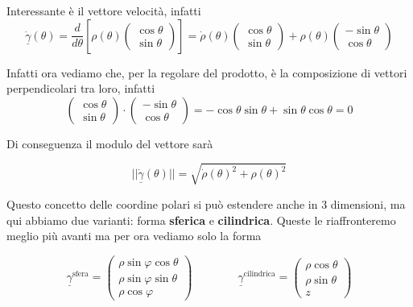 \documentclass{rapport}
\begin{document}
\begin{figure}[htbp]
\begin{minipage}{0.31\textwidth}
    \end{minipage}
    
\end{figure}


Interessante è il vettore velocità, infatti 
\[
\underline{\dot{\gamma}}(\theta) = \dfrac{d}{d\theta} \left[\rho(\theta) \begin{pmatrix}
  \cos\theta \\
  \sin\theta 
\end{pmatrix}\right] =\dot{\rho}(\theta) \begin{pmatrix}
  \cos\theta \\
  \sin\theta 
\end{pmatrix} + \rho(\theta) \begin{pmatrix}
  -\sin\theta \\
  \cos\theta 
\end{pmatrix}
\]

Infatti ora vediamo che, per la regolare del prodotto, è la composizione di vettori perpendicolari tra loro, infatti 
\[
\begin{pmatrix}
  \cos\theta \\
  \sin\theta 
\end{pmatrix} \cdot \begin{pmatrix}
  -\sin\theta \\
  \cos\theta 
\end{pmatrix} = -\cos\theta\sin\theta +\sin\theta\cos\theta  = 0
\]

Di conseguenza il modulo del vettore sarà

\[
||\underline{\dot{\gamma}}(\theta)|| = \sqrt{\dot{\rho}(\theta)^2 + \rho(\theta)^2}
\]


Questo concetto delle coordine polari si può estendere anche in 3 dimensioni, ma qui abbiamo due varianti: forma \textbf{sferica} e \textbf{cilindrica}. Queste le riaffronteremo meglio più avanti ma per ora vediamo solo la forma 

\[
\underline{\gamma}^{\text{sfera}} = \begin{pmatrix}
  \rho \sin \varphi \cos \theta \\
  \rho \sin \varphi \sin \theta \\
  \rho \cos \varphi
\end{pmatrix} \qquad\qquad
\underline{\gamma}^{\text{cilindrica}} = \begin{pmatrix}
  \rho \cos \theta \\
  \rho \sin \theta \\
  z
\end{pmatrix}
\]
\end{document}
